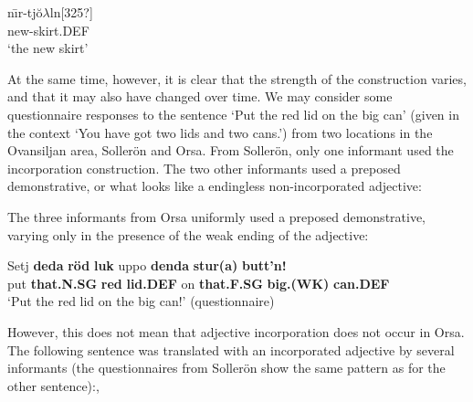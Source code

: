 \ea\label{}
\gll n{\=\i}r-tj\u{o}$\lambda $ln[325?]\\
new-skirt.DEF\\
\glt ‘the new skirt’
\z

At the same time, however, it is clear that the strength of the construction varies, and that it may also have changed over time. We may consider some questionnaire responses to the sentence ‘Put the red lid on the big can’ (given in the context ‘You have got two lids and two cans.’) from two locations in the Ovansiljan area, Sollerön and Orsa. From Sollerön, only one informant used the incorporation construction. The two other informants used a preposed demonstrative, or what looks like a endingless non-incorporated adjective: 

\ea\label{}


\z
\z

The three informants from Orsa uniformly used a preposed demonstrative, varying only in the presence of the weak ending of the adjective: 

\ea\label{}
\gll Setj  \textbf{deda} \textbf{röd} \textbf{luk} uppo  \textbf{denda} \textbf{stur(a)} \textbf{butt’n!}\\
put  \textbf{that.N.SG} \textbf{red} \textbf{lid.DEF} on  \textbf{that.F.SG} \textbf{big.(WK)} \textbf{can.DEF}\\
\glt ‘Put the red lid on the big can!’ (questionnaire)
\z

However, this does not mean that adjective incorporation does not occur in Orsa. The following sentence was translated with an incorporated adjective by several informants (the questionnaires from Sollerön show the same pattern as for the other sentence):,

